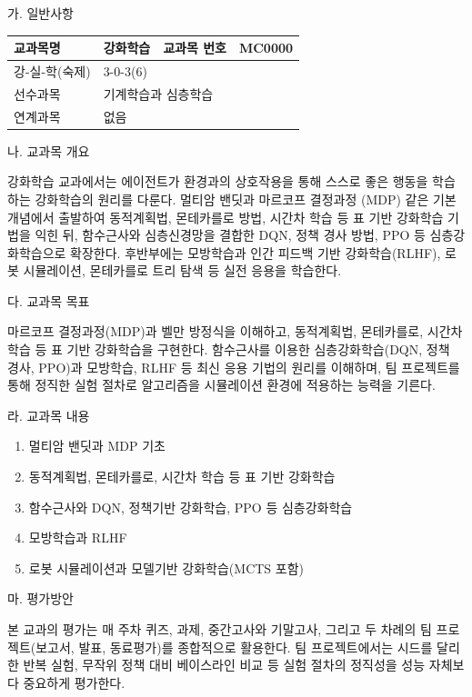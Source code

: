 \documentclass[11pt,a4paper]{article}
\newcommand{\gilban}[5]{%
  \noindent
  \begin{tabular}{|p{2.3cm}|p{4.3cm}|p{2.3cm}|p{4.3cm}|}
    \hline
    \centering 교과목명 & \centering\arraybackslash #1 & \centering 교과목 번호 & \centering\arraybackslash #2 \\
    \hline
    \centering 강-실-학(숙제) & \multicolumn{3}{l|}{\hspace{2mm}#3} \\
    \hline
    \centering 선수과목 & \multicolumn{3}{l|}{\hspace{2mm}#4} \\
    \hline
    \centering 연계과목 & \multicolumn{3}{l|}{\hspace{2mm}#5} \\
    \hline
  \end{tabular}
}
\newcounter{gwamok}
\newcommand{\gwamoktitle}[3]{%
  \stepcounter{gwamok}
  \vspace{6mm}
  \noindent{\bf \thegwamok. #1 (#2, #3)}\par
  \vspace{1mm}
  \noindent\hspace*{3mm}가. 일반사항\par
  \vspace{1mm}
}
\begin{document}
\clearpage

\gwamoktitle{강화학습}{선택}{3학점}
\gilban{강화학습}{MC0000}{3-0-3(6)}{기계학습과 심층학습}{없음}

\vspace{3mm}
\hspace*{3mm}나. 교과목 개요\\[1mm]
\hspace*{5mm}\begin{minipage}{0.92\textwidth}
강화학습 교과에서는 에이전트가 환경과의 상호작용을 통해 스스로 좋은 행동을
학습하는 강화학습의 원리를 다룬다. 멀티암 밴딧과 마르코프 결정과정
(MDP) 같은 기본 개념에서 출발하여 동적계획법, 몬테카를로 방법, 시간차
학습 등 표 기반 강화학습 기법을 익힌 뒤, 함수근사와 심층신경망을 결합한
DQN, 정책 경사 방법, PPO 등 심층강화학습으로 확장한다. 후반부에는
모방학습과 인간 피드백 기반 강화학습(RLHF), 로봇 시뮬레이션, 몬테카를로
트리 탐색 등 실전 응용을 학습한다.
\end{minipage}

\vspace{3mm}
\hspace*{3mm}다. 교과목 목표\\[1mm]
\hspace*{5mm}\begin{minipage}{0.92\textwidth}
마르코프 결정과정(MDP)과 벨만 방정식을 이해하고, 동적계획법, 몬테카를로,
시간차 학습 등 표 기반 강화학습을 구현한다. 함수근사를
이용한 심층강화학습(DQN, 정책 경사, PPO)과 모방학습, RLHF 등 최신
응용 기법의 원리를 이해하며, 팀 프로젝트를 통해 정직한 실험 절차로
알고리즘을 시뮬레이션 환경에 적용하는 능력을 기른다.
\end{minipage}

\vspace{3mm}
\hspace*{3mm}라. 교과목 내용
\begin{enumerate}[leftmargin=13mm,itemsep=0mm,label=\arabic*)]
\item 멀티암 밴딧과 MDP 기초
\item 동적계획법, 몬테카를로, 시간차 학습 등 표 기반 강화학습
\item 함수근사와 DQN, 정책기반 강화학습, PPO 등 심층강화학습
\item 모방학습과 RLHF
\item 로봇 시뮬레이션과 모델기반 강화학습(MCTS 포함)
\end{enumerate}

\vspace{3mm}
\hspace*{3mm}마. 평가방안\\[1mm]
\hspace*{5mm}\begin{minipage}{0.92\textwidth}
본 교과의 평가는 매 주차 퀴즈, 과제, 중간고사와 기말고사, 그리고 두
차례의 팀 프로젝트(보고서, 발표, 동료평가)를 종합적으로 활용한다. 팀
프로젝트에서는 시드를 달리한 반복 실험, 무작위 정책 대비 베이스라인
비교 등 실험 절차의 정직성을 성능 자체보다 중요하게 평가한다.
\end{minipage}
\end{document}
